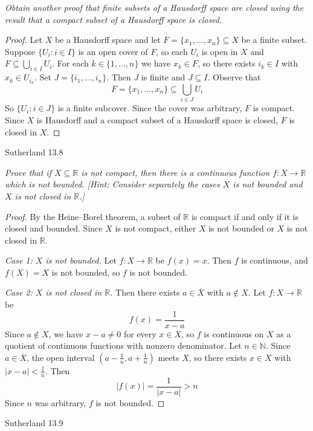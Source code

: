 \documentclass[minion]{homework}
\newcommand{\Reals}{\ensuremath{\mathbb R}}%
\newcommand{\Nats}{\ensuremath{\mathbb N}} %
\begin{document}
\begin{problems}
\textit{Obtain another proof that finite subsets of a Hausdorff space are closed using the result that a compact subset of a Hausdorff space is closed.}
\newline
\begin{proof}
  Let $X$ be a Hausdorff space and let $F = \{x_1, \dots, x_n\} \subseteq X$ be a finite subset.
  Suppose $\{U_i : i \in I\}$ is an open cover of $F$, so each $U_i$ is open in $X$ and $F \subseteq \bigcup_{i \in I} U_i$.
  For each $k \in \{1, \dots, n\}$ we have $x_k \in F$, so there exists $i_k \in I$ with $x_k \in U_{i_k}$.
  Set $J = \{i_1, \dots, i_n\}$. Then $J$ is finite and $J \subseteq I$. Observe that
  $$F = \{x_1, \dots, x_n\} \subseteq \bigcup_{i \in J} U_i$$
  So $\{U_i : i \in J\}$ is a finite subcover. Since the cover was arbitrary, $F$ is compact.
  Since $X$ is Hausdorff and a compact subset of a Hausdorff space is closed, $F$ is closed in $X$.
\end{proof}
\problem Sutherland 13.8

\textit{Prove that if $X \subseteq \Reals$ is not compact, then there is a continuous function $f \colon X \to \Reals$ which is not bounded.
[Hint: Consider separately the cases $X$ is not bounded and $X$ is not closed in $\Reals$.]}
\newline
\begin{proof}
  By the Heine--Borel theorem, a subset of $\Reals$ is compact if and only if it is closed and bounded. Since $X$ is not compact, either $X$ is not bounded or $X$ is not closed in $\Reals$.

  \emph{Case 1: $X$ is not bounded.} Let $f \colon X \to \Reals$ be $f(x) = x$. Then $f$ is continuous, and $f(X) = X$ is not bounded, so $f$ is not bounded.

  \emph{Case 2: $X$ is not closed in $\Reals$.} Then there exists $a \in \overline{X}$ with $a \notin X$. Let $f \colon X \to \Reals$ be
  $$f(x) = \frac{1}{x - a}$$
  Since $a \notin X$, we have $x - a \neq 0$ for every $x \in X$, so $f$ is continuous on $X$ as a quotient of continuous functions with nonzero denominator.
  Let $n \in \Nats$. Since $a \in \overline{X}$, the open interval $(a - \tfrac{1}{n}, a + \tfrac{1}{n})$ meets $X$, so there exists $x \in X$ with $|x - a| < \tfrac{1}{n}$. Then
  $$|f(x)| = \frac{1}{|x - a|} > n$$
  Since $n$ was arbitrary, $f$ is not bounded.
\end{proof}
\problem Sutherland 13.9


\end{problems}
\end{document}
